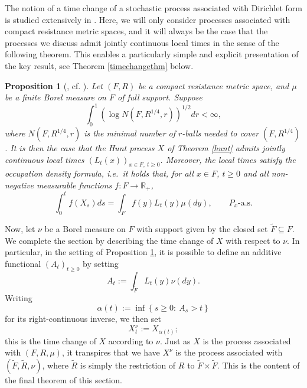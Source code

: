 \documentclass[a4paper, 11pt]{article}
\newtheorem{prop}[theorem]{Proposition}
\begin{document}
The notion of a time change of a stochastic process associated with Dirichlet form is studied extensively in \cite[Section 6.2]{FOT}. Here, we will only consider processes associated with compact resistance metric spaces, and it will always be the case that the processes we discuss admit jointly continuous local times in the sense of the following theorem. This enables a particularly simple and explicit presentation of the key result, see Theorem \ref{timechangethm} below.

\begin{prop}[{\cite[Proposition 4.15]{Noda}, cf. \cite[Lemma 2.2]{Cr2}}]\label{localtimes}
Let $(F,R)$ be a compact resistance metric space, and $\mu$ be a finite Borel measure on $F$ of full support. Suppose
\begin{equation}\label{cover}
\int_0^1\left(\log N(F,R^{1/4},r)\right)^{1/2}dr<\infty,
\end{equation}
where $N(F,R^{1/4},r)$ is the minimal number of $r$-balls needed to cover $(F,R^{1/4})$. It is then the case that the Hunt process $X$ of Theorem \ref{hunt} admits jointly continuous local times $(L_t(x))_{x\in F,\:t\geq0}$. Moreover, the local times satisfy the occupation density formula, i.e.\ it holds that, for all $x \in F$, $t \geq 0$ and all non-negative measurable functions $f:F \rightarrow\mathbb{R}_+$,
\[\int_{0}^tf(X_s)ds = \int_F f(y)L_t(y)\mu(dy),\qquad P_x\mbox{-a.s.}\]
\end{prop}

Now, let $\nu$ be a Borel measure on $F$ with support given by the closed set $\tilde{F}\subseteq F$. We complete the section by describing the time change of $X$ with respect to $\nu$. In particular, in the setting of Proposition \ref{localtimes}, it is possible to define an additive functional $(A_t)_{t\geq0}$ by setting
\[A_t:=\int_{\tilde{F}}L_t(y)\nu(dy).\]
Writing
\[\alpha(t):=\inf\left\{s\geq 0:\:A_s>t\right\}\]
for its right-continuous inverse, we then set
\begin{equation}\label{xnudef}
{X}^\nu_t:=X_{\alpha(t)};
\end{equation}
this is the time change of $X$ according to $\nu$. Just as $X$ is the process associated with $(F,R,\mu)$, it transpires that we have ${X}^\nu$ is the process associated with $(\tilde{F},\tilde{R},\nu)$, where $\tilde{R}$ is simply the restriction of $R$ to $\tilde{F}\times\tilde{F}$. This is the content of the final theorem of this section.
\end{document}
